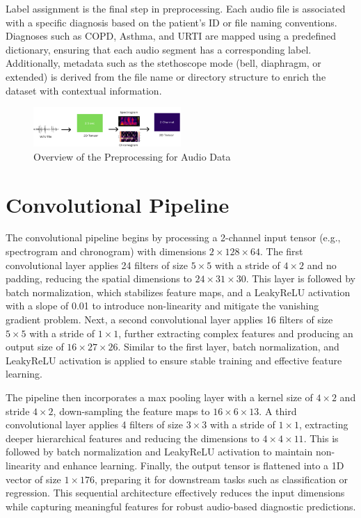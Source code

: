 \documentclass[twocolumn]{article}
\begin{document}
Label assignment is the final step in preprocessing. Each audio file is associated with a specific diagnosis based on the patient's ID or file naming conventions. Diagnoses such as COPD, Asthma, and URTI are mapped using a predefined dictionary, ensuring that each audio segment has a corresponding label. Additionally, metadata such as the stethoscope mode (bell, diaphragm, or extended) is derived from the file name or directory structure to enrich the dataset with contextual information.

\begin{figure}[h]
  \centering
  \includegraphics[width=0.5\textwidth]{Pre-Prrocessing}
  \caption{Overview of the Preprocessing for Audio Data}
  \label{fig:Pre-Prrocessing}
\end{figure}

\section{Convolutional Pipeline}
The convolutional pipeline begins by processing a 2-channel input tensor (e.g., spectrogram and chronogram) with dimensions \(2 \times 128 \times 64\). The first convolutional layer applies 24 filters of size \(5 \times 5\) with a stride of \(4 \times 2\) and no padding, reducing the spatial dimensions to \(24 \times 31 \times 30\). This layer is followed by batch normalization, which stabilizes feature maps, and a LeakyReLU activation with a slope of 0.01 to introduce non-linearity and mitigate the vanishing gradient problem. Next, a second convolutional layer applies 16 filters of size \(5 \times 5\) with a stride of \(1 \times 1\), further extracting complex features and producing an output size of \(16 \times 27 \times 26\). Similar to the first layer, batch normalization, and LeakyReLU activation is applied to ensure stable training and effective feature learning.

The pipeline then incorporates a max pooling layer with a kernel size of \(4 \times 2\) and stride \(4 \times 2\), down-sampling the feature maps to \(16 \times 6 \times 13\). A third convolutional layer applies 4 filters of size \(3 \times 3\) with a stride of \(1 \times 1\), extracting deeper hierarchical features and reducing the dimensions to \(4 \times 4 \times 11\). This is followed by batch normalization and LeakyReLU activation to maintain non-linearity and enhance learning. Finally, the output tensor is flattened into a 1D vector of size \(1 \times 176\), preparing it for downstream tasks such as classification or regression. This sequential architecture effectively reduces the input dimensions while capturing meaningful features for robust audio-based diagnostic predictions.
\end{document}
